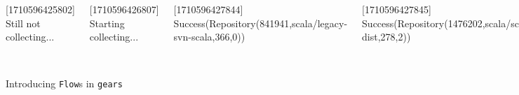 \documentclass[aspectratio=1610,xcolor=dvipsnames]{beamer}
\begin{document}

\begin{frame}
  \begin{columns}
      

      

      \footnotesize
      [1710596425802] Still not collecting...

      [1710596426807] Starting collecting...

      [1710596427844] Success(Repository(841941,scala/legacy-svn-scala,366,0))

      [1710596427845] Success(Repository(1476202,scala/scala-dist,278,2))

      ...

      [1710596428750] Done!

      \vspace*{0.4cm}

      [1710596865118] Still not collecting...

      [1710596866120] Starting collecting...

      [1710596866383] Failure(java.lang.Exception:\{"message":"Not Found",...\})

      [1710596866383] Done!

      \vspace*{1.2cm}
  \end{columns}
\end{frame}


\begin{frame}{Introducing \texttt{Flow}s in \texttt{gears}}
  
\end{frame}


\begin{frame}
  
\end{frame}


\begin{frame}
  
\end{frame}
\end{document}
